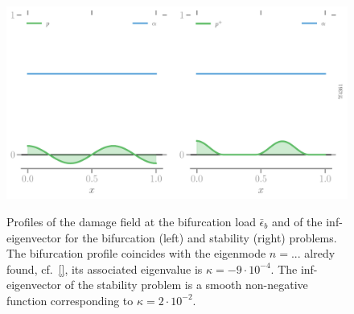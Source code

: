 \begin{figure}[htbp]
    \centering
    \includegraphics*[width=.95\textwidth]{../images/profiles-bif-stab-7f4361886184f3c6791fe16bf4f4b3f2.pdf}
    \label{fig:irreversibility}
    \caption{Profiles of the damage field at the bifurcation load $\bar \epsilon_b$ and of the inf-eigenvector for the bifurcation (left) and stability (right) problems. The bifurcation profile coincides with the eigenmode $n=...$ alredy found, cf.~\eqref{}, its associated eigenvalue is $\kappa = -9\cdot 10^{-4}$. The inf-eigenvector of the stability problem is a smooth non-negative function corresponding to $\kappa=2\cdot 10^{-2}$.}
\end{figure}
